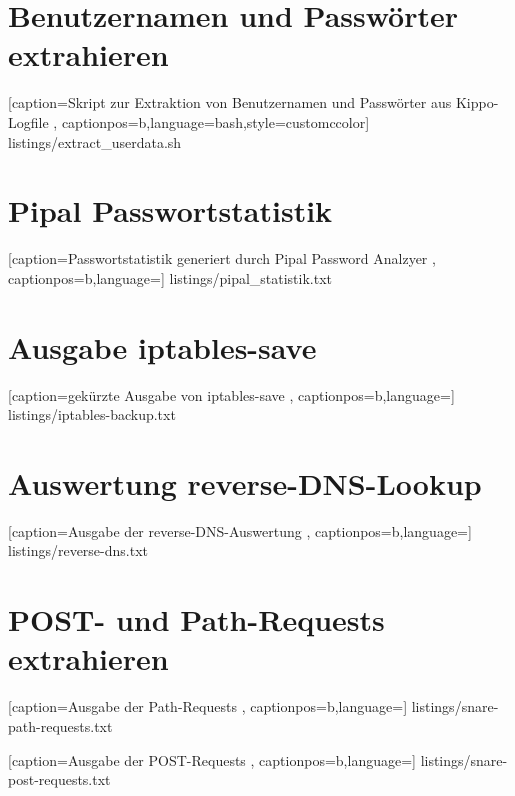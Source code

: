\newpage

\section*{Benutzernamen und Passwörter extrahieren}
\label{app:Benutzernamen und Passwörter extrahieren}


    [caption={Skript zur Extraktion von Benutzernamen und Passwörter aus Kippo-Logfile}
       \label{lst:mitm_onmsg},
       captionpos=b,language=bash,style=customccolor]
 {listings/extract_userdata.sh}
 
 
\newpage
 
\section*{Pipal Passwortstatistik}
\label{app:Pipal Passwortstatistik}


    [caption={Passwortstatistik generiert durch Pipal Password Analzyer}
       \label{lst:mitm_onmsg},
       captionpos=b,language={}]
 {listings/pipal_statistik.txt}
 
 
\newpage 
 
\section*{Ausgabe iptables-save}
\label{app:Ausgabe iptables-save}


    [caption={gekürzte Ausgabe von iptables-save}
       \label{lst:mitm_onmsg},
       captionpos=b,language={}]
 {listings/iptables-backup.txt}
 

\newpage 
 
\section*{Auswertung reverse-DNS-Lookup}
\label{app:Auswertung reverse-DNS-Lookup}


    [caption={Ausgabe der reverse-DNS-Auswertung}
       \label{lst:reverse_dns},
       captionpos=b,language={}]
 {listings/reverse-dns.txt}
 
 
\newpage 
 
\section*{POST- und Path-Requests extrahieren}
\label{app:POST- und Path-Requests extrahieren}


    [caption={Ausgabe der Path-Requests}
       \label{lst:snare-path-requests},
       captionpos=b,language={}]
 {listings/snare-path-requests.txt} 
 
 
    [caption={Ausgabe der POST-Requests}
       \label{lst:snare-post-requests},
       captionpos=b,language={}]
 {listings/snare-post-requests.txt} 
 